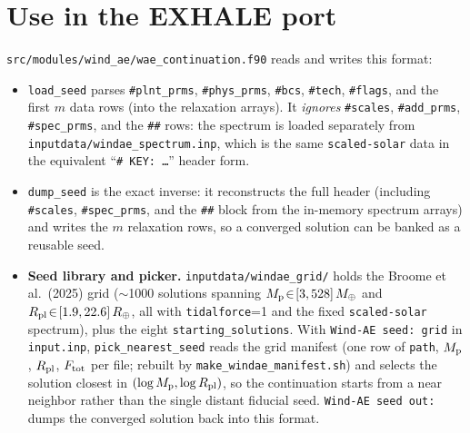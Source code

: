 \documentclass[english,a4paper]{my_memo}
\newcommand{\Rp}{\ensuremath{R_{\rm pl}}}
\newcommand{\code}[1]{\texttt{#1}}
\newcommand{\Ftot}{\ensuremath{F_{\rm tot}}}
\newcommand{\hd}[1]{\code{\##1}}      %
\begin{document}
\section{Use in the EXHALE port}
\code{src/modules/wind\_ae/wae\_continuation.f90} reads and writes this
format:
\begin{itemize}\itemsep2pt
  \item \code{load\_seed} parses \hd{plnt\_prms}, \hd{phys\_prms},
        \hd{bcs}, \hd{tech}, \hd{flags}, and the first $m$ data rows (into
        the relaxation arrays). It \emph{ignores} \hd{scales},
        \hd{add\_prms}, \hd{spec\_prms}, and the \code{\#\#} rows: the
        spectrum is loaded separately from
        \code{inputdata/windae\_spectrum.inp}, which is the same
        \code{scaled-solar} data in the equivalent
        ``\code{\# KEY: \dots}'' header form.
  \item \code{dump\_seed} is the exact inverse: it reconstructs the full
        header (including \hd{scales}, \hd{spec\_prms}, and the
        \code{\#\#} block from the in-memory spectrum arrays) and writes
        the $m$ relaxation rows, so a converged solution can be banked as a
        reusable seed.
  \item \textbf{Seed library and picker.} \code{inputdata/windae\_grid/}
        holds the Broome et al.\ (2025) grid ($\sim$1000 solutions spanning
        $M_{\rm p}\!\in\![3,528]\,M_\oplus$ and
        $\Rp\!\in\![1.9,22.6]\,R_\oplus$, all with \code{tidalforce}=1 and
        the fixed \code{scaled-solar} spectrum), plus the eight
        \code{starting\_solutions}. With \code{Wind-AE seed: grid} in
        \code{input.inp}, \code{pick\_nearest\_seed} reads the grid manifest
        (one row of \code{path}, $M_{\rm p}$, $\Rp$, $\Ftot$ per file;
        rebuilt by \code{make\_windae\_manifest.sh}) and selects the
        solution closest in $(\log M_{\rm p},\log\Rp)$, so the continuation
        starts from a near neighbor rather than the single distant fiducial
        seed. \code{Wind-AE seed out:} dumps the converged solution back
        into this format.
\end{itemize}
\end{document}
